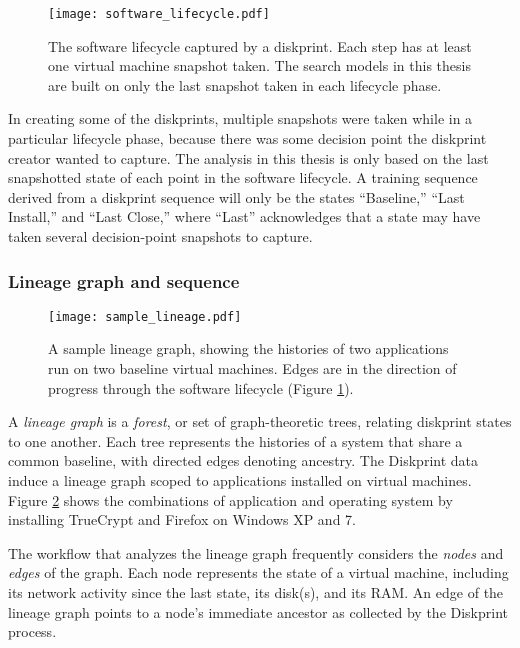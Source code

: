 \documentclass[11pt]{ucthesis}
\theoremstyle{plain}
\theoremstyle{definition}
\begin{document}
\begin{figure}
\begin{center}
\texttt{[image: software\_lifecycle.pdf]}
\caption{\label{fig:diskprintlifecycle}The software lifecycle captured by a diskprint.  Each step has at least one virtual machine snapshot taken.  The search models in this thesis are built on only the last snapshot taken in each lifecycle phase.}
\end{center}
\end{figure}

In creating some of the diskprints, multiple snapshots were taken while in a particular lifecycle phase, because there was some decision point the diskprint creator wanted to capture.  The analysis in this thesis is only based on the last snapshotted state of each point in the software lifecycle.  A training sequence derived from a diskprint sequence will only be the states ``Baseline,'' ``Last Install,'' and ``Last Close,'' where ``Last'' acknowledges that a state may have taken several decision-point snapshots to capture.


\subsubsection{Lineage graph and sequence}

\begin{figure}
\begin{center}
\texttt{[image: sample\_lineage.pdf]}
\caption{\label{fig:term-lineagegraph}A sample lineage graph, showing the histories of two applications run on two baseline virtual machines.  Edges are in the direction of progress through the software lifecycle (Figure \ref{fig:diskprintlifecycle}).}
\end{center}
\end{figure}

A \emph{lineage graph} is a \emph{forest}, or set of graph-theoretic trees, relating diskprint states to one another.  Each tree represents the histories of a system that share a common baseline, with directed edges denoting ancestry.  The Diskprint data induce a lineage graph scoped to applications installed on virtual machines.  Figure \ref{fig:term-lineagegraph} shows the combinations of application and operating system by installing TrueCrypt and Firefox on Windows XP and 7.

The workflow that analyzes the lineage graph frequently considers the \emph{nodes} and \emph{edges} of the graph.  Each node represents the state of a virtual machine, including its network activity since the last state, its disk(s), and its RAM.  An edge of the lineage graph points to a node's immediate ancestor as collected by the Diskprint process.
\end{document}
